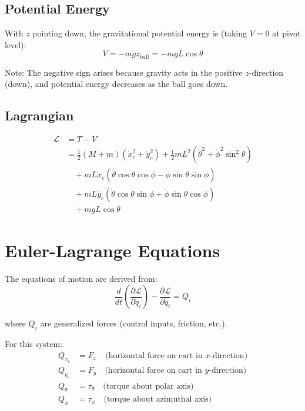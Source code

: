 \documentclass[12pt]{article}
\begin{document}
\subsection{Potential Energy}

With $z$ pointing down, the gravitational potential energy is (taking $V = 0$ at pivot level):
\begin{equation}
    V = -mgz_{\text{ball}} = -mgL\cos\theta
\end{equation}

Note: The negative sign arises because gravity acts in the positive $z$-direction (down), and potential energy decreases as the ball goes down.

\subsection{Lagrangian}
\begin{align}
    \mathcal{L} &= T - V \nonumber \\
    &= \frac{1}{2}(M + m)(\dot{x}_c^2 + \dot{y}_c^2) + \frac{1}{2}mL^2(\dot{\theta}^2 + \dot{\phi}^2\sin^2\theta) \nonumber \\
    &\quad + mL\dot{x}_c(\dot{\theta}\cos\theta\cos\phi - \dot{\phi}\sin\theta\sin\phi) \nonumber \\
    &\quad + mL\dot{y}_c(\dot{\theta}\cos\theta\sin\phi + \dot{\phi}\sin\theta\cos\phi) \nonumber \\
    &\quad + mgL\cos\theta
\end{align}

\section{Euler-Lagrange Equations}

The equations of motion are derived from:
\begin{equation}
    \frac{d}{dt}\left(\frac{\partial\mathcal{L}}{\partial\dot{q}_i}\right) - \frac{\partial\mathcal{L}}{\partial q_i} = Q_i
\end{equation}

where $Q_i$ are generalized forces (control inputs, friction, etc.).

For this system:
\begin{align}
    Q_{x_c} &= F_x \quad \text{(horizontal force on cart in $x$-direction)} \\
    Q_{y_c} &= F_y \quad \text{(horizontal force on cart in $y$-direction)} \\
    Q_\theta &= \tau_\theta \quad \text{(torque about polar axis)} \\
    Q_\phi &= \tau_\phi \quad \text{(torque about azimuthal axis)}
\end{align}
\end{document}
